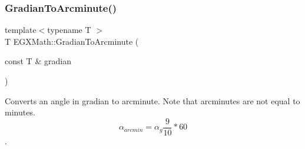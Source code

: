 \mbox{\label{group___e_g_x_math-_conversions-_angle_conversions-_gradian_ga67ef7daad49b0d73c39c52d426ab46a5}} 
\subsubsection{\texorpdfstring{Gradian\+To\+Arcminute()}{GradianToArcminute()}}
{\footnotesize\ttfamily template$<$typename T $>$ \\
T E\+G\+X\+Math\+::\+Gradian\+To\+Arcminute (\begin{DoxyParamCaption}\item[{const T \&}]{gradian }\end{DoxyParamCaption})}



Converts an angle in gradian to arcminute. Note that arcminutes are not equal to minutes. \[\alpha_{arcmin}=\alpha_{g}\frac{9}{10} * 60\]. 


